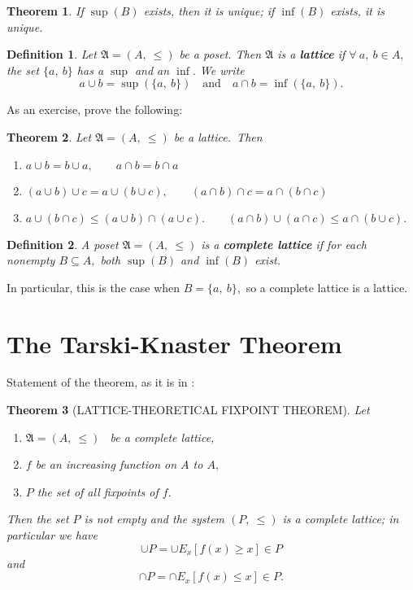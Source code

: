 \documentclass[12pt]{article}
\newtheorem{definition}{Definition}
\newtheorem{theorem}{Theorem}
\numberwithin{equation}{section}
\begin{document}
\begin{theorem}
If $\sup(B)$ exists, then it is unique; if $\inf(B)$ exists, it is unique.
\end{theorem}

\begin{definition}
Let $\mathfrak{A}=(A,\ \leq)$ be a poset. Then $\mathfrak{A}$ is a
\textbf{lattice} if $\forall\ a,\ b\in A,$ the set $\{a,\ b\}$ has a $\sup$
and an $\inf.$ We write
\[
a\cup b=\sup(\{a,\ b\})\quad\text{and}\quad a\cap b=\inf(\{a,\ b\}).
\]

\end{definition}

As an exercise, prove the following:

\begin{theorem}
Let $\mathfrak{A}=(A,\ \leq)$ be a lattice.\ Then

\begin{enumerate}
\item $a\cup b=b\cup a,\qquad a\cap b=b\cap a$

\item $(a\cup b)\cup c=a\cup(b\cup c),\qquad(a\cap b)\cap c=a\cap(b\cap c)$

\item $a\cup(b\cap c)\leq(a\cup b)\cap(a\cup c).\qquad(a\cap b)\cup(a\cap
c)\leq a\cap(b\cup c).$
\end{enumerate}
\end{theorem}

\begin{definition}
A poset $\mathfrak{A}=(A,\ \leq)$ is a \textbf{complete lattice} if for each
nonempty $B\subseteq A,$ both $\sup(B)$ and $\inf(B)$ exist.
\end{definition}

In particular, this is the case when $B=\{a,\ b\},$ so a complete lattice is a lattice.

\section{The Tarski-Knaster Theorem}

Statement of the theorem, as it is in \cite{tarski}:

\begin{theorem}
[LATTICE-THEORETICAL FIXPOINT THEOREM]Let

\begin{enumerate}
\item[(i)] $\mathfrak{A}=(A,\ \leq)$ \ be a complete lattice,

\item[(ii)] $f$ be an increasing function on $A$ to $A,$

\item[(iii)] $P$ the set of all fixpoints of $f.$
\end{enumerate}

Then the set $P$ is not empty and the system $(P,\ \leq)$ is a complete
lattice; in particular we have
\[
\cup P=\cup E_{x}[f(x)\geq x]\in P
\]
and
\[
\cap P=\cap E_{x}[f(x)\leq x]\in P.
\]

\end{theorem}
\end{document}
